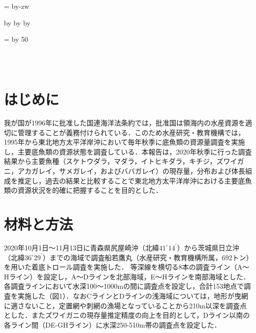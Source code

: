 \documentclass[11pt]{article} %
\makeatletter
\def\mojiparline#1{
\newcounter{mpl}
\setcounter{mpl}{#1}
\@tempdima=\linewidth
\advance\@tempdima by-\value{mpl}zw
\addtocounter{mpl}{-1}
\divide\@tempdima by \value{mpl}
\advance\kanjiskip by\@tempdima
\advance\parindent by\@tempdima
}
\def\linesparpage#1{
\baselineskip=\textheight
\divide\baselineskip by #1
}
\makeatother
\begin{document}

\mojiparline{40} %
\linesparpage{50} %


\\
\\

\begin{linenumbers}
\section{はじめに}
我が国が1996年に批准した国連海洋法条約では，批准国は領海内の水産資源を適切に管理することが義務付けられている．このため水産研究・教育機構では，1995年から東北地方太平洋岸沖において毎年秋季に底魚類の資源量調査を実施し，主要底魚類の資源状態を調査している．本報告は，2020年秋季に行った調査結果から主要魚種（スケトウダラ，マダラ，イトヒキダラ，キチジ，ズワイガニ，アカガレイ，サメガレイ，およびババガレイ）の現存量，分布および体長組成を推定し，過去の結果と比較することで東北地方太平洋岸沖における主要底魚類の資源状況を的確に把握することを目的とした．

\section{材料と方法}
2020年10月1日～11月13日に青森県尻屋崎沖（北緯$\textrm{41}^\circ \textrm{14}^\prime$）から茨城県日立沖（北緯$\textrm{36}^\circ \textrm{29}^\prime$）までの海域で調査船若鷹丸（水産研究・教育機構所属，692トン）を用いた着底トロール調査を実施した．
等深線を横切る8本の調査ライン（A～Hライン）を設定し，A～Dラインを北部海域，E～Hラインを南部海域とした．各調査ラインにおいて水深100～1000mの間に調査点を設定し，合計153地点で調査を実施した（図1）．なおCラインとDラインの浅海域については，地形が曳網に適さないこと，定置網や刺網の漁場となっていることから210m以深を調査点とした．またズワイガニの現存量推定精度の向上を目的として，Dライン以南の各ライン間（DE-GHライン）に水深250-510m帯の調査点を設定した．


\end{linenumbers}
\end{document}
